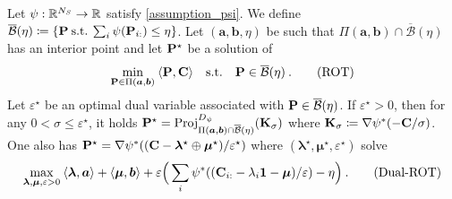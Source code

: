 \begin{proposition}\label{prop:cot}
    Let $\psi : \mathbb{R}^{N_S} \to \mathbb{R}$ satisfy \cref{assumption_psi}. We define $\overline{\mathcal{B}}(\eta) \coloneqq \{ {\mathbf{P}} \: \text{s.t.} \: \sum_i \psi({\mathbf{P}}_{i:}) \leq \eta \}$. Let $(\bm{a}, \bm{b}, \eta)$ be such that $\Pi(\bm{a}, \bm{b}) \cap \overline{\mathcal{B}}(\eta)$ has an interior point and let ${\mathbf{P}}^\star$ be a solution of
\begin{align}
    \min_{{\mathbf{P}} \in \Pi(\bm{a}, \bm{b})} \: \langle {\mathbf{P}}, {\mathbf{C}} \rangle \quad \text{s.t.} \quad  {\mathbf{P}} \in \overline{\mathcal{B}}(\eta) \:.
    \tag{ROT}
\end{align}
    Let $\varepsilon^\star$ be an optimal dual variable associated with ${\mathbf{P}} \in \overline{\mathcal{B}}(\eta)$.
    If $\varepsilon^\star > 0$, then for any $0 < \sigma \leq \varepsilon^\star$, it holds ${\mathbf{P}}^\star = \operatorname{Proj}^{D_\psi}_{\Pi(\bm{a}, \bm{b}) \cap \overline{\mathcal{B}}(\eta)}({\mathbf{K}}_\sigma)$
    where ${\mathbf{K}}_\sigma \coloneqq \nabla \psi^*(-{\mathbf{C}}/ \sigma)$.
    One also has ${\mathbf{P}}^\star = \nabla \psi^*(({\mathbf{C}} - \bm{\lambda}^\star \oplus \bm{\mu}^\star) / \varepsilon^\star)$
    where $(\bm{\lambda}^\star, \bm{\mu}^\star, \varepsilon^\star)$ solve
    \begin{align}
        \max_{\bm{\lambda}, \bm{\mu}, \varepsilon>0}  \: \langle \bm{\lambda}, \bm{a} \rangle + \langle \bm{\mu}, \bm{b} \rangle + \varepsilon \Big(\sum_i \psi^*((\mathbf{C}_{i:} - \lambda_i \bm{1} - \bm{\mu}) / \varepsilon) - \eta \Big) \:.
    \tag{Dual-ROT}
    \end{align}
\end{proposition}

